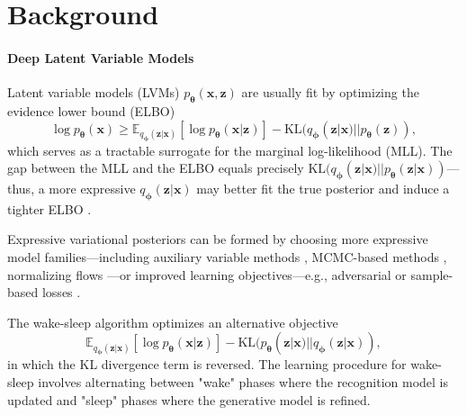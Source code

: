 \documentclass[letterpaper]{article} %
\newcommand{\bx}{\mathbf{x}}
\newcommand{\bz}{\mathbf{z}}
\newcommand\KL{\text{KL}}
\let\oldtheta\theta
\renewcommand{\theta}{{\boldsymbol \oldtheta}}
\let\oldphi\phi
\renewcommand{\phi}{{\boldsymbol \oldphi}}
\begin{document}
\section{Background}


\paragraph{Deep Latent Variable Models}

Latent variable models (LVMs)  $p_\theta(\bx, \bz)$ are usually fit by optimizing the evidence lower bound (ELBO) 
\begin{equation}
\log p_\theta(\bx) \geq \mathbb{E}_{q_\phi(\bz|\bx)} [\log p_\theta(\bx|\bz)] - \KL(q_\phi(\bz|\bx)||p_\theta(\bz)), \nonumber
\end{equation}
which serves as a tractable surrogate for the marginal log-likelihood (MLL). The gap between the MLL and the ELBO equals precisely $\KL(q_\phi(\bz|\bx)||p_\theta(\bz|\bx))$---thus, a more expressive $q_\phi(\bz|\bx)$ may better fit the true posterior and induce a tighter ELBO \citep{kingma2013auto}.

Expressive variational posteriors can be formed by choosing more expressive model families---including auxiliary variable methods \citep{maaloe2016auxiliary}, MCMC-based methods \citep{salimans2015mcmc}, normalizing flows \citep{rezende2015variational}---or improved learning objectives---e.g., adversarial or sample-based losses \citep{makhzani2015adversarial,zhao2017infovae,si2022autoregressive,pmlr-v202-si23a}.

The wake-sleep algorithm \citep{hinton1995wake} optimizes an alternative objective
\begin{equation}
\mathbb{E}_{q_\phi(\bz|\bx)} [\log p_\theta(\bx|\bz)] - \KL(p_\theta(\bz|\bx)||q_\phi(\bz|\bx)), \nonumber
\end{equation}
in which the KL divergence term is reversed. The learning procedure for wake-sleep involves alternating between "wake" phases where the recognition model is updated and "sleep" phases where the generative model is refined.
\end{document}
